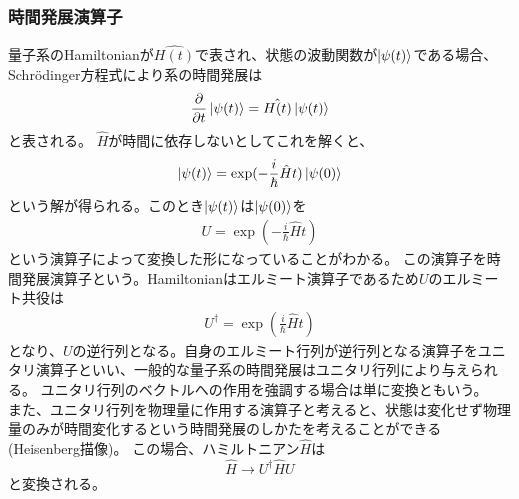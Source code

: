         \subsubsection{時間発展演算子}
        量子系のHamiltonianが$\hat{H(t)}$で表され、状態の波動関数が$\ket{\psi(t)}$である場合、
        Schr\"{o}dinger方程式により系の時間発展は
        \begin{equation}
            \frac{\partial}{\partial t}\ket{\psi(t)} = \hat{H(t)}\ket{\psi(t)}
        \end{equation}
        と表される。
        $\hat{H}$が時間に依存しないとしてこれを解くと、
        \begin{eqnarray}
            \ket{\psi(t)} = \exp (-\frac{i}{\hbar}\hat{H}t)\ket{\psi(0)}
        \end{eqnarray}
        という解が得られる。このとき$\ket{\psi(t)}$は$\ket{\psi(0)}$を
        \begin{eqnarray}
            U = \exp (-\frac{i}{\hbar}\hat{H}t)
        \end{eqnarray}
        という演算子によって変換した形になっていることがわかる。
        この演算子を時間発展演算子という。Hamiltonianはエルミート演算子であるため$U$のエルミート共役は
        \begin{eqnarray}
            U^\dagger = \exp (\frac{i}{\hbar}\hat{H}t)
        \end{eqnarray}
        となり、$U$の逆行列となる。自身のエルミート行列が逆行列となる演算子をユニタリ演算子といい、一般的な量子系の時間発展はユニタリ行列により与えられる。
        ユニタリ行列のベクトルへの作用を強調する場合は単に変換ともいう。\\
        また、ユニタリ行列を物理量に作用する演算子と考えると、状態は変化せず物理量のみが時間変化するという時間発展のしかたを考えることができる(Heisenberg描像)。
        この場合、ハミルトニアン$\hat{H}$は
        \begin{equation}
           \hat{H} \to U^\dagger \hat{H} U
        \end{equation}
        と変換される。
